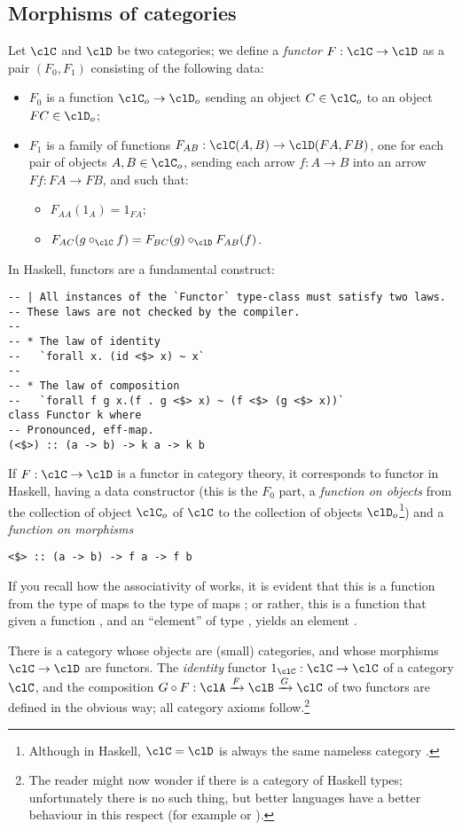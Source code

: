 \documentclass[11pt]{article}
\begin{document}
\subsection{Morphisms of categories}
\begin{definition}[Functor]
	Let $\clC$ and $\clD$ be two categories; we define a \emph{functor} $F :\clC\to \clD$ as a pair $(F_0, F_1)$ consisting of the following data:
	\begin{itemize}
		\item  $F_0$ is a function $\clC_o\to  \clD_o$ sending an object $C\in \clC_o$ to an object $FC \in \clD_o$;
		\item  $F_1$ is a family of functions $F_{AB} : \clC(A,B)\to \clD(FA,FB)$, one for each pair of objects $A,B\in\clC_o$, sending each arrow $f:A\to B$ into an arrow $Ff:FA\to FB$, and such that:
		\begin{itemize}
			\item $F_{AA} (1_A)=1_{F A}$;
			\item $F_{AC} (g\circ_\clC f)=F_{BC} (g)\circ_\clD F_{AB} (f)$.
		\end{itemize}
	\end{itemize}
\end{definition}
In Haskell, functors are a fundamental construct:
\begin{verbatim}
-- | All instances of the `Functor` type-class must satisfy two laws.
-- These laws are not checked by the compiler.
--
-- * The law of identity
--   `forall x. (id <$> x) ~ x`
--
-- * The law of composition
--   `forall f g x.(f . g <$> x) ~ (f <$> (g <$> x))`
class Functor k where
-- Pronounced, eff-map.
(<$>) :: (a -> b) -> k a -> k b
\end{verbatim}
If $F : \clC \to \clD$ is a functor in category theory, it corresponds to functor in Haskell, having a data constructor  (this is  the $F_0$ part, a \emph{function on objects} from the collection of object $\clC_o$ of $\clC$ to the collection of objects $\clD_o$\footnote{Although in Haskell, $\clC=\clD$ is always the same nameless category \mil{*}.}) and a \emph{function on morphisms}
\begin{verbatim}
<$> :: (a -> b) -> f a -> f b
\end{verbatim}
If you recall how the associativity of \mil{->} works, it is evident that this is a function from the type of maps  to the type of maps ; or rather, this is a function that given a function , and an ``element'' of type , yields an element .
\begin{remark}
	There is a category whose objects are (small) categories, and whose morphisms $\clC\to \clD$ are functors. The \emph{identity} functor $1_{\clC} : \clC \to \clC$ of a category $\clC$, and the composition $G\circ F : \clA \xrightarrow{F} \clB \xrightarrow{G} \clC$ of two functors are defined in the obvious way; all category axioms follow.\footnote{The reader might now wonder if there is a category of Haskell types; unfortunately there is no such thing, but better languages have a better behaviour in this respect (for example  or ).}
\end{remark}
\end{document}
